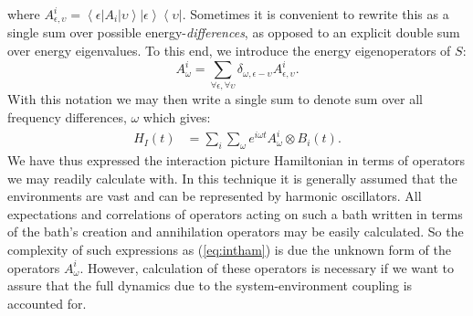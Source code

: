 \documentclass[11pt,a4paper,article,oneside]{memoir}
\newcommand{\bra}[1]{\left\langle #1\right|}
\newcommand{\ket}[1]{\left| #1\right\rangle}
\newcommand{\outr}[2]{\left| #1\right\rangle\left\langle #2\right|}
\begin{document}
where $A^i_{\epsilon,\upsilon} = \bra{\epsilon}A_i\ket{\upsilon}
\outr{\epsilon}{\upsilon}$.  Sometimes it is convenient to rewrite
this as a single sum over possible energy-\textit{differences}, as
opposed to an explicit double sum over energy eigenvalues. To this
end, we introduce the energy eigenoperators of $S$:
\begin{equation}
	A^i_\omega=\sum_{\forall\epsilon,\forall\upsilon}\delta_{\omega,\epsilon-\upsilon}A^i_{\epsilon,\upsilon}.
\end{equation}
With this notation we may then write a single sum to denote sum over
all frequency differences, $\omega$ which gives:
\begin{align}
H_I(t) &=\sum_i\sum_{\omega}e^{i\omega t}A^i_\omega\otimes B_i(t).
\label{eq:intham}
\end{align}
We have thus expressed the interaction picture Hamiltonian in terms of
operators we may readily calculate with. In this technique it is
generally assumed that the environments are vast and can be
represented by harmonic oscillators. All expectations and correlations
of operators acting on such a bath written in terms of the bath's
creation and annihilation operators may be easily calculated. So the
complexity of such expressions as (\ref{eq:intham}) is due the unknown
form of the operators $A^i_\omega$. However, calculation of these
operators is necessary if we want to assure that the full dynamics due
to the system-environment coupling is accounted for.
\end{document}
